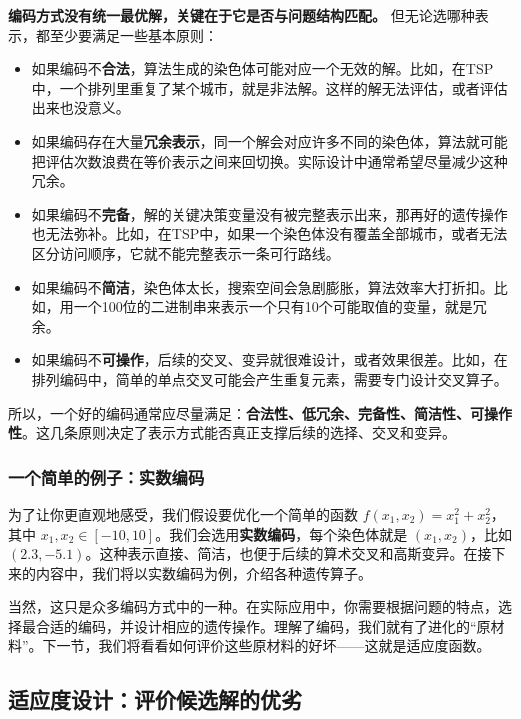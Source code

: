 \documentclass[lang=cn,zihao=-4,a4paper,fontset=windows]{beautybook}
\begin{document}
\textbf{编码方式没有统一最优解，关键在于它是否与问题结构匹配。} 但无论选哪种表示，都至少要满足一些基本原则：

\begin{itemize}
    \item 如果编码不\textbf{合法}，算法生成的染色体可能对应一个无效的解。比如，在TSP中，一个排列里重复了某个城市，就是非法解。这样的解无法评估，或者评估出来也没意义。
    \item 如果编码存在大量\textbf{冗余表示}，同一个解会对应许多不同的染色体，算法就可能把评估次数浪费在等价表示之间来回切换。实际设计中通常希望尽量减少这种冗余。
    \item 如果编码不\textbf{完备}，解的关键决策变量没有被完整表示出来，那再好的遗传操作也无法弥补。比如，在TSP中，如果一个染色体没有覆盖全部城市，或者无法区分访问顺序，它就不能完整表示一条可行路线。
    \item 如果编码不\textbf{简洁}，染色体太长，搜索空间会急剧膨胀，算法效率大打折扣。比如，用一个100位的二进制串来表示一个只有10个可能取值的变量，就是冗余。
    \item 如果编码不\textbf{可操作}，后续的交叉、变异就很难设计，或者效果很差。比如，在排列编码中，简单的单点交叉可能会产生重复元素，需要专门设计交叉算子。
\end{itemize}

所以，一个好的编码通常应尽量满足：\textbf{合法性、低冗余、完备性、简洁性、可操作性}。这几条原则决定了表示方式能否真正支撑后续的选择、交叉和变异。

\subsubsection*{一个简单的例子：实数编码}

为了让你更直观地感受，我们假设要优化一个简单的函数 \(f(x_1, x_2) = x_1^2 + x_2^2\)，其中 \(x_1, x_2 \in [-10, 10]\)。我们会选用\textbf{实数编码}，每个染色体就是 \((x_1, x_2)\)，比如 \((2.3, -5.1)\)。这种表示直接、简洁，也便于后续的算术交叉和高斯变异。在接下来的内容中，我们将以实数编码为例，介绍各种遗传算子。

当然，这只是众多编码方式中的一种。在实际应用中，你需要根据问题的特点，选择最合适的编码，并设计相应的遗传操作。理解了编码，我们就有了进化的“原材料”。下一节，我们将看看如何评价这些原材料的好坏——这就是适应度函数。

\subsection{适应度设计：评价候选解的优劣}
\end{document}
